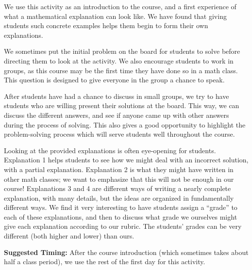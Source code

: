 \documentclass{ximera}
\begin{document}
\begin{instructorNotes}
We use this activity as an introduction to the course, and a first experience of what a mathematical explanation can look like.  We have found that giving students such concrete examples helps them begin to form their own explanations.


We sometimes put the initial problem on the board for students to solve before directing them to look at the activity.  We also encourage students to work in groups, as this course may be the first time they have done so in a math class.  This question is designed to give everyone in the group a chance to speak.

After students have had a chance to discuss in small groups, we try to have students who are willing present their solutions at the board.  This way, we can discuss the different answers, and see if anyone came up with other answers during the process of solving.  This also gives a good opportunity to highlight the problem-solving process which will serve students well throughout the course.



Looking at the provided explanations is often eye-opening for students.  Explanation 1 helps students to see how we might deal with an incorrect solution, with a partial explanation.  Explanation 2 is what they might have written in other math classes; we want to emphasize that this will not be enough in our course!  Explanations 3 and 4 are different ways of writing a nearly complete explanation, with many details, but the ideas are organized in fundamentally different ways.  We find it very interesting to have students assign a ``grade'' to each of these explanations, and then to discuss what grade we ourselves might give each explanation according to our rubric.  The students' grades can be very different (both higher and lower) than ours.


{\bf Suggested Timing:} After the course introduction (which sometimes takes about half a class period), we use the rest of the first day for this activity.

\end{instructorNotes}
\end{document}
